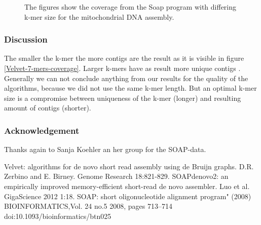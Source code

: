 \documentclass[%
   10pt,              %
   ngerman,           %
   a4paper,           %
   DIV11,             %
]{scrartcl}%
\begin{document}
\begin{figure}[h]
	\caption{The figures show the coverage from the Soap program with differing k-mer size for the mitochondrial DNA assembly.}
		\label{SOAP-Results}
\end{figure}

\subsubsection*{Discussion}
The smaller the k-mer the more contigs are the result as it is visible in figure \ref{Velvet-7-mers-coverage}. Larger k-mers have as result more unique contigs \cite{VelvetProgram}. Generally we can not conclude anything from our results for the quality of the algorithms, because we did not use the same k-mer length. But an optimal k-mer size is a compromise between uniqueness of the k-mer (longer) and resulting amount of contigs (shorter).

\subsubsection*{Acknowledgement}
Thanks again to Sanja Koehler an her group for the SOAP-data.

\begin{thebibliography}{20}
	 Velvet: algorithms for de novo short read assembly using de Bruijn graphs. D.R. Zerbino and E. Birney. Genome Research 18:821-829. 
	 SOAPdenovo2: an empirically improved memory-efficient short-read de novo assembler. Luo et al. GigaScience 2012 1:18.
	SOAP: short oligonucleotide alignment program" (2008) BIOINFORMATICS,Vol. 24 no.5 2008, pages 713–714 doi:10.1093/bioinformatics/btn025
	
\end{thebibliography}
\end{document}
